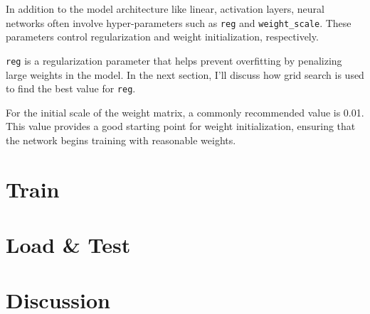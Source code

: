 \documentclass[10pt,a4paper,twoside]{tau}
\begin{document}
In addition to the model architecture like linear, activation layers, neural networks often involve hyper-parameters such as \texttt{reg} and \texttt{weight\_scale}. These parameters control regularization and weight initialization, respectively.

\texttt{reg} is a regularization parameter that helps prevent overfitting by penalizing large weights in the model. In the next section, I'll discuss how grid search is used to find the best value for \texttt{reg}.

For the initial scale of the weight matrix, a commonly recommended value is 0.01. This value provides a good starting point for weight initialization, ensuring that the network begins training with reasonable weights.


\section{Train}
\section{Load \& Test}
\section{Discussion}





		


		
\end{document}
